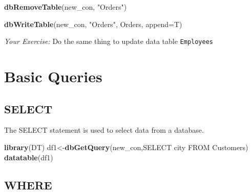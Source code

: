 \documentclass[
]{book}
\newenvironment{Shaded}{\begin{snugshade}}{\end{snugshade}}
\newcommand{\AttributeTok}[1]{\textcolor[rgb]{0.13,0.29,0.53}{#1}}
\newcommand{\FunctionTok}[1]{\textcolor[rgb]{0.13,0.29,0.53}{\textbf{#1}}}
\newcommand{\NormalTok}[1]{#1}
\newcommand{\OtherTok}[1]{\textcolor[rgb]{0.56,0.35,0.01}{#1}}
\newcommand{\SpecialCharTok}[1]{\textcolor[rgb]{0.81,0.36,0.00}{\textbf{#1}}}
\newcommand{\StringTok}[1]{\textcolor[rgb]{0.31,0.60,0.02}{#1}}
\begin{document}
\begin{Shaded}
\begin{Highlighting}[]
\FunctionTok{dbRemoveTable}\NormalTok{(new\_con, }\StringTok{"Orders"}\NormalTok{)}
\end{Highlighting}
\end{Shaded}

\begin{Shaded}
\end{Shaded}

\begin{Shaded}
\begin{Highlighting}[]
\FunctionTok{dbWriteTable}\NormalTok{(new\_con, }\StringTok{"Orders"}\NormalTok{, Orders, }\AttributeTok{append=}\NormalTok{T) }
\end{Highlighting}
\end{Shaded}

\emph{Your Exercise:} Do the same thing to update data table \texttt{Employees}

\hypertarget{basic-queries}{%
\section{Basic Queries}\label{basic-queries}}

\hypertarget{select}{%
\subsection{SELECT}\label{select}}

The SELECT statement is used to select data from a database.

\begin{Shaded}
\begin{Highlighting}[]
\FunctionTok{library}\NormalTok{(DT)}
\NormalTok{df1}\OtherTok{\textless{}{-}}\FunctionTok{dbGetQuery}\NormalTok{(new\_con,}\StringTok{\textquotesingle{}SELECT city}
\StringTok{                         FROM Customers\textquotesingle{}}\NormalTok{)}
\FunctionTok{datatable}\NormalTok{(df1)}
\end{Highlighting}
\end{Shaded}

\hypertarget{where}{%
\subsection{WHERE}\label{where}}
\end{document}
